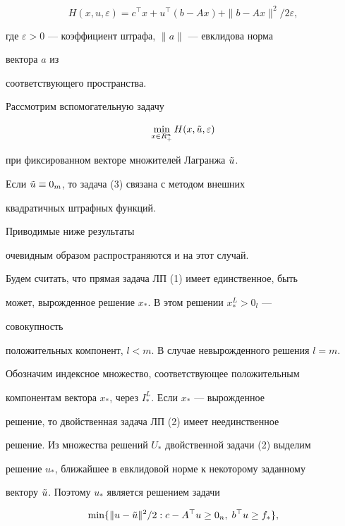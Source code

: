$$


H(x,u,\varepsilon)=c^\top x+u^\top(b-Ax)+\|b-Ax\|^2/2\varepsilon,


$$


где $\varepsilon>0$ --- коэффициент штрафа, $\|a\|$ --- евклидова норма


вектора $a$ из


соответствующего пространства.





Рассмотрим вспомогательную задачу


\begin{equation}


\min_{x\in R^n_+}H(x,\Tilde u,\varepsilon)


\end{equation}


при фиксированном векторе множителей Лагранжа $\Tilde u$.


Если $\Tilde u\equiv 0_m$, то задача (3) связана с методом внешних


квадратичных штрафных функций.


Приводимые ниже результаты


очевидным образом распространяются и на этот случай.





Будем считать, что прямая задача ЛП (1) имеет единственное, быть


может, вырожденное решение $x_*$. В этом решении $x^L_*>0_l$ ---


совокупность


положительных компонент, $l<m$. В случае невырожденного решения $l=m$.


Обозначим индексное множество, соответствующее положительным


компонентам вектора $x_*$, через $I^L_*$. Если $x_*$ --- вырожденное


решение, то двойственная задача ЛП (2) имеет неединственное


решение. Из множества решений $U_*$ двойственной задачи (2) выделим


решение $u_*$, ближайшее в евклидовой норме к некоторому заданному


вектору $\Tilde u$. Поэтому $u_*$ является решением задачи


\begin{equation}


\min\{\|u-\Tilde u\|^2/2 : c-A^\top u\ge 0_n,\;


b^\top u\ge f_*\},


\end{equation}


